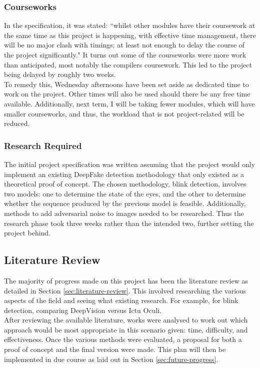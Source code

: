 \documentclass{article}
\begin{document}
\subsubsection{Courseworks}

In the specification, it was stated: ``whilst other modules have their coursework at the same time as this project is happening, with effective time management, there will be no major clash with timings; at least not enough to delay the course of the project significantly." It turns out some of the courseworks were more work than anticipated, most notably the compilers coursework. This led to the project being delayed by roughly two weeks.\\

To remedy this, Wednesday afternoons have been set aside as dedicated time to work on the project. Other times will also be used should there be any free time available. Additionally, next term, I will be taking fewer modules, which will have smaller courseworks, and thus, the workload that is not project-related will be reduced.

\subsubsection{Research Required}

The initial project specification was written assuming that the project would only implement an existing DeepFake detection methodology that only existed as a theoretical proof of concept. The chosen methodology, blink detection, involves two models: one to determine the state of the eyes, and the other to determine whether the sequence produced by the previous model is feasible. Additionally, methods to add adversarial noise to images needed to be researched. Thus the research phase took three weeks rather than the intended two, further setting the project behind.

\subsection{Literature Review}

The majority of progress made on this project has been the literature review as detailed in Section \ref{sec:literature-review}. This involved researching the various aspects of the field and seeing what existing research. For example, for blink detection, comparing DeepVision versus Ictu Oculi.\\

After reviewing the available literature, works were analysed to work out which approach would be most appropriate in this scenario given: time, difficulty, and effectiveness. Once the various methods were evaluated, a proposal for both a proof of concept and the final version were made. This plan will then be implemented in due course as laid out in Section \ref{sec:future-progress}.
\end{document}
